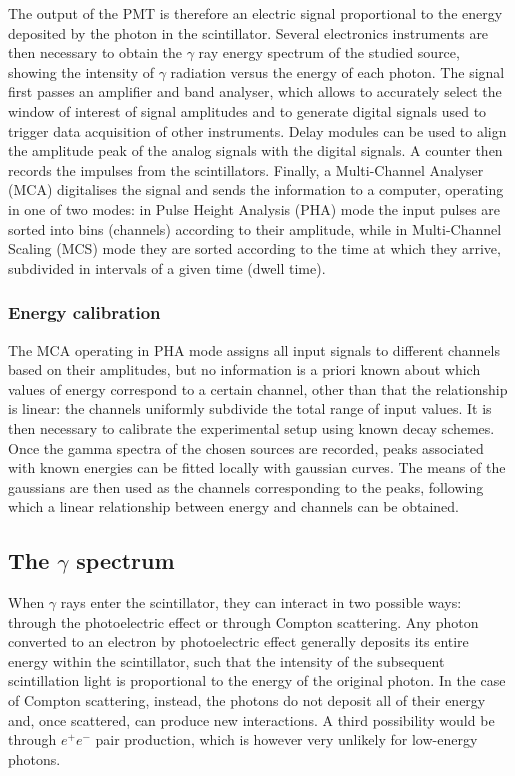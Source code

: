 The output of the PMT is therefore an electric signal proportional to the energy deposited by the photon in the scintillator.
Several electronics instruments are then necessary to obtain the $\gamma$ ray energy spectrum of the studied source, 
showing the intensity of $\gamma$ radiation versus the energy of each photon.
The signal first passes an amplifier and band analyser, which allows to accurately select the window of interest of signal amplitudes and to generate digital signals used to trigger data acquisition of other instruments.
Delay modules can be used to align the amplitude peak of the analog signals with the digital signals.
A counter then records the impulses from the scintillators.
Finally, a Multi-Channel Analyser (MCA) digitalises the signal and sends the information to a computer, operating in one of two modes: 
in Pulse Height Analysis (PHA) mode the input pulses are
sorted into bins (channels) according to their amplitude, while in Multi-Channel Scaling (MCS) mode they are sorted according to the time at which they arrive, subdivided in intervals of a given time (dwell time).


\subsubsection{Energy calibration}
\label{sec:energy_calibration}

The MCA operating in PHA mode assigns all input signals to different channels based on their amplitudes, 
but no information is a priori known about which values of energy correspond to a certain channel,
other than that the relationship is linear: 
the channels uniformly subdivide the total range of input values.
It is then necessary to calibrate the experimental setup using known decay schemes.
Once the gamma spectra of the chosen sources are recorded, peaks associated with known energies can be fitted locally with gaussian curves.
The means of the gaussians are then used as the channels corresponding to the peaks, following which a linear relationship between energy and channels can be obtained.

\subsection{The $\gamma$ spectrum}
\label{sec:spectrum}

When $\gamma$ rays enter the scintillator, they can interact in two possible ways: through the photoelectric effect or through Compton scattering.
Any photon converted to an electron by photoelectric effect generally deposits its entire energy within the scintillator, such that the intensity of the subsequent scintillation light is proportional to the energy of the original photon.
In the case of Compton scattering, instead, the photons do not deposit all of their energy and, once scattered, can produce new interactions.
A third possibility would be through $e^+ e^-$ pair production, which is however very unlikely for low-energy photons.

